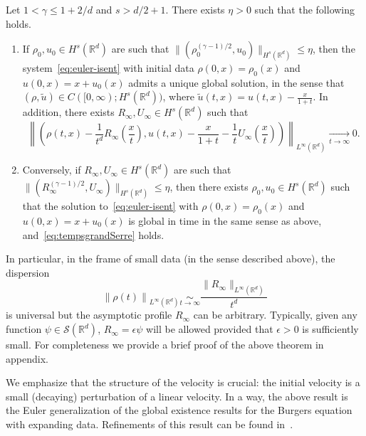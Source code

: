 \documentclass[AHL,Unicode,longabstracts]{cedram}
\newcommand*\R{\mathbb{R}}
\newcommand*\Sch{\mathcal{S}}
\newcommand*\<{\left\langle}
\renewcommand*\>{\right\rangle}
\renewcommand*\le{\leqslant}
\newcommand*\Eq[2]{\mathop{\sim}\limits_{#1\rightarrow#2}}
\newcommand*\Tend[2]{\mathop{\longrightarrow}\limits_{#1\rightarrow#2}}
\begin{document}
\begin{theo}\label{theo:serre}
Let $1<\gamma\le 1+2/d$ and $s>d/2+1$. There exists $\eta>0$ such that the following holds.
\begin{enumerate}
\item \label{1.1.1} If $\rho_0,u_0\in H^s(\R^d)$ are such that $\|(\rho_0^{(\gamma-1)/2},u_0)\|_{H^s(\R^d)}\le \eta $, then the system~\eqref{eq:euler-isent} with initial data $\rho(0,x) = \rho_0(x)$ and $u(0,x) = x + u_0(x)$ admits a unique global solution, in the sense that $(\rho,\tilde u)\in C([0,\infty);H^s(\R^d))$, where $\tilde u(t,x)=u(t,x)-\frac{x}{1+t}$. In addition, there exists $R_\infty,U_\infty\in H^s(\R^d)$ such that
\begin{equation}\label{eq:tempsgrandSerre}
\left\| \left(\rho (t,x)-\frac{1}{t^d}R_\infty\left(\frac{x}{t}\right),u(t,x) -\frac{x}{1+t}-\frac{1}{t}U_\infty
\left(\frac{x}{t}\right)\right)\right\|_{L^\infty(\R^d)}\Tend t \infty 0.
\end{equation}
\item \label{1.1.2} Conversely, if $R_\infty,U_\infty\in H^s(\R^d)$ are such that $\|(R_\infty^{(\gamma-1)/2},U_\infty)\|_{H^s(\R^d)}\le \eta$, then there exists $\rho_0,u_0\in H^s(\R^d)$ such that the solution to~\eqref{eq:euler-isent} with $ \rho(0,x)=\rho_0(x)$ and $ u(0,x) = x+u_0(x)$ is global in time in the same sense as above, and~\eqref{eq:tempsgrandSerre} holds.
\end{enumerate}
\end{theo}

In particular, in the frame of small data (in the sense described above), the dispersion
\begin{equation*}
\left\| \rho(t)\right\|_{L^\infty(\R^d)}\Eq t \infty \frac{\|R_\infty\|_{L^\infty(\R^d)}}{t^d}
\end{equation*}
is universal but the asymptotic profile $R_\infty$ can be arbitrary. Typically, given any function $\psi\in \Sch(\R^d)$, $R_\infty= \epsilon \psi$ will be allowed provided that $\epsilon>0$ is sufficiently small. For completeness we provide a brief proof of the above theorem in appendix.

We emphasize that the structure of the velocity is crucial: the initial velocity is a small (decaying) perturbation of a linear velocity. In a way, the above result is the Euler generalization of the global existence results for the Burgers equation with expanding data. Refinements of this result can be found in~\cite{GrSe97,Gra98,Serre2017}.
\end{document}
